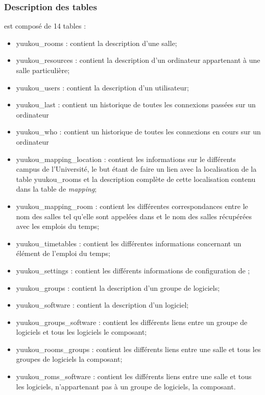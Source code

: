 \begin{appendices}
\subsubsection{Description des tables}

{\YuukouII} est compos\'e de 14 tables :

\begin{itemize}
	\item \textsf{yuukou\_rooms} : contient la description d'une salle;
	\item \textsf{yuukou\_resources} : contient la description d'un ordinateur appartenant \`a une salle particuli\`ere;
	\item \textsf{yuukou\_users} : contient la description d'un utilisateur;
	\item \textsf{yuukou\_last} : contient un historique de toutes les connexions pass\'ees sur un ordinateur
	\item \textsf{yuukou\_who} : contient un historique de toutes les connexions en cours sur un ordinateur
	\item \textsf{yuukou\_mapping\_location} : contient les informations sur le diff\'erents campus de l'Universit\'e, le but \'etant de faire un lien avec la localisation de la table \textsf{yuukou\_rooms} et la description compl\`ete de cette localisation contenu dans la table de \textit{mapping};
	\item \textsf{yuukou\_mapping\_room} : contient les diff\'erentes correspondances entre le nom des salles tel qu'elle sont appel\'ees dans {\YuukouII} et le nom des salles r\'ecup\'er\'ees avec les emplois du temps;
	\item \textsf{yuukou\_timetables} : contient les diff\'erentes informations concernant un \'el\'ement de l'emploi du temps;
	\item \textsf{yuukou\_settings} : contient les diff\'erents informations de configuration de \YuukouII;
	\item \textsf{yuukou\_groups} : contient la description d'un groupe de logiciels;
	\item \textsf{yuukou\_software} : contient la description d'un logiciel;
	\item \textsf{yuukou\_groups\_software} : contient les diff\'erents liens entre un groupe de logiciels et tous les logiciels le composant;
	\item \textsf{yuukou\_rooms\_groups} : contient les diff\'erents liens entre une salle et tous les groupes de logiciels la composant;
	\item \textsf{yuukou\_roms\_software} : contient les diff\'erents liens entre une salle et tous les logiciels, n'appartenant pas \`a un groupe de logiciels, la composant.
	

\end{itemize}
\end{appendices}

